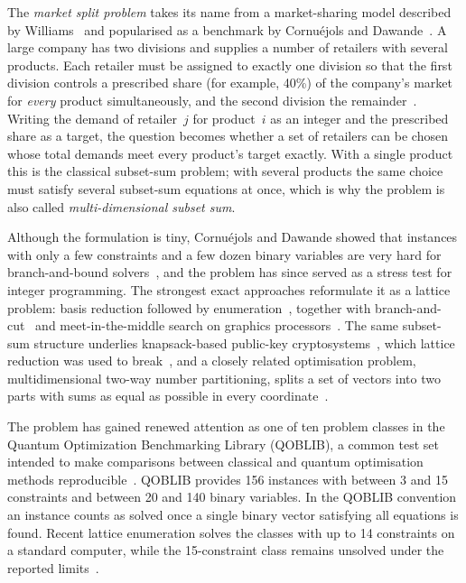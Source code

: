 \documentclass[pdflatex,sn-mathphys-num]{sn-jnl}
\theoremstyle{thmstyleone}
\theoremstyle{thmstylethree}
\begin{document}
The \emph{market split problem} takes its name from a market-sharing model described by Williams~\cite{williams1978} and popularised as a benchmark by Cornu\'ejols and Dawande~\cite{cornuejols1998}. A large company has two divisions and supplies a number of retailers with several products. Each retailer must be assigned to exactly one division so that the first division controls a prescribed share (for example, 40\%) of the company's market for \emph{every} product simultaneously, and the second division the remainder~\cite{cornuejols1998}. Writing the demand of retailer~$j$ for product~$i$ as an integer and the prescribed share as a target, the question becomes whether a set of retailers can be chosen whose total demands meet every product's target exactly. With a single product this is the classical subset-sum problem; with several products the same choice must satisfy several subset-sum equations at once, which is why the problem is also called \emph{multi-dimensional subset sum}.

Although the formulation is tiny, Cornu\'ejols and Dawande showed that instances with only a few constraints and a few dozen binary variables are very hard for branch-and-bound solvers~\cite{cornuejols1998}, and the problem has since served as a stress test for integer programming. The strongest exact approaches reformulate it as a lattice problem: basis reduction followed by enumeration~\cite{aardal1999,aardal2000,wassermann2002,wassermann2021,wassermann2026}, together with branch-and-cut~\cite{vogel2012} and meet-in-the-middle search on graphics processors~\cite{kempkekoch2026}. The same subset-sum structure underlies knapsack-based public-key cryptosystems~\cite{merkle1978}, which lattice reduction was used to break~\cite{lagarias1985}, and a closely related optimisation problem, multidimensional two-way number partitioning, splits a set of vectors into two parts with sums as equal as possible in every coordinate~\cite{kojic2010,kratica2014,santucci2021}.

The problem has gained renewed attention as one of ten problem classes in the Quantum Optimization Benchmarking Library (QOBLIB), a common test set intended to make comparisons between classical and quantum optimisation methods reproducible~\cite{koch2025}. QOBLIB provides 156 instances with between 3 and 15 constraints and between 20 and 140 binary variables. In the QOBLIB convention an instance counts as solved once a single binary vector satisfying all equations is found. Recent lattice enumeration solves the classes with up to 14 constraints on a standard computer, while the 15-constraint class remains unsolved under the reported limits~\cite{wassermann2026}.
\end{document}
